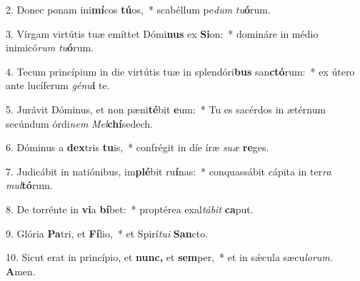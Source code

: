 \item 2. Donec ponam ini\textbf{mí}cos \textbf{tú}os,~* scabéllum pe\hspace{0.03em}\textit{dum} \textit{tu}\textbf{ó}rum.

\item 3. Vírgam virtútis tuæ emíttet Dómi\textbf{nus} ex \textbf{Si}on:~* domináre in médio inimicó\textit{rum} \textit{tu}\textbf{ó}rum.

\item 4. Tecum princípium in die virtútis tuæ in splendóri\textbf{bus} san\textbf{ctó}rum:~* ex útero ante lucíferum \textit{génu}\textbf{i} te.

\item 5. Jurávit Dóminus, et non pæni\textbf{té}bit \textbf{e}um:~* Tu es sacérdos in ætérnum secúndum órdi\textit{nem} \textit{Mel}\textbf{chí}sedech.

\item 6. Dóminus a \textbf{dex}tris \textbf{tu}is,~* confrégit in díe íræ \textit{suæ} \textbf{re}ges.

\item 7. Judicábit in natiónibus, im\textbf{plé}bit ru\textbf{í}nas:~* conquassábit cápita in ter\textit{ra} \textit{mul}\textbf{tó}rum.

\item 8. De torrénte in \textbf{vi}a \textbf{bí}bet:~* proptérea exal\textit{tábit} \textbf{ca}put.

\item 9. Glória \textbf{Pa}tri, et \textbf{Fí}lio,~* et Spirí\textit{tui} \textbf{San}cto.

\item 10. Sicut erat in princípio, et \textbf{nunc,} et \textbf{sem}per,~* et in sǽcula sæcu\hspace{0.03em}\textit{lorum.} \textbf{A}men.
